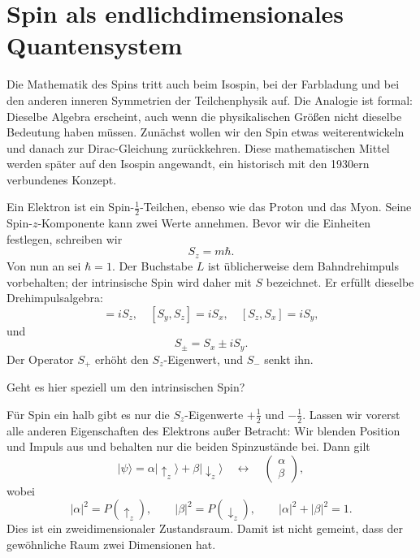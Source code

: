 \section{Spin als endlichdimensionales Quantensystem}

Die Mathematik des Spins tritt auch beim Isospin, bei der Farbladung und bei den anderen inneren Symmetrien der Teilchenphysik auf. Die Analogie ist formal: Dieselbe Algebra erscheint, auch wenn die physikalischen Größen nicht dieselbe Bedeutung haben müssen. Zunächst wollen wir den Spin etwas weiterentwickeln und danach zur Dirac-Gleichung zurückkehren. Diese mathematischen Mittel werden später auf den Isospin angewandt, ein historisch mit den 1930ern verbundenes Konzept.

Ein Elektron ist ein Spin-\(\tfrac12\)-Teilchen, ebenso wie das Proton und das Myon. Seine Spin-\(z\)-Komponente kann zwei Werte annehmen. Bevor wir die Einheiten festlegen, schreiben wir
\begin{equation}
S_z=m\hbar.
\end{equation}
Von nun an sei \(\hbar=1\). Der Buchstabe \(L\) ist üblicherweise dem Bahndrehimpuls vorbehalten; der intrinsische Spin wird daher mit \(S\) bezeichnet. Er erfüllt dieselbe Drehimpulsalgebra:
\begin{equation}
[S_x,S_y]=iS_z,
\quad
[S_y,S_z]=iS_x,
\quad
[S_z,S_x]=iS_y,
\end{equation}
und
\begin{equation}
S_\pm=S_x\pm iS_y.
\end{equation}
Der Operator \(S_+\) erhöht den \(S_z\)-Eigenwert, und \(S_-\) senkt ihn.

\begin{classroomqa}
Geht es hier speziell um den intrinsischen Spin?\audiencequestion{
}
\end{classroomqa}

Für Spin ein halb gibt es nur die \(S_z\)-Eigenwerte \(+\tfrac12\) und \(-\tfrac12\). Lassen wir vorerst alle anderen Eigenschaften des Elektrons außer Betracht: Wir blenden Position und Impuls aus und behalten nur die beiden Spinzustände bei. Dann gilt
\begin{equation}
|\psi\rangle
=
\alpha|\uparrow_z\rangle+\beta|\downarrow_z\rangle
\quad\longleftrightarrow\quad
\begin{pmatrix}
\alpha\\
\beta
\end{pmatrix},
\end{equation}
wobei
\begin{equation}
|\alpha|^2=P(\uparrow_z),
\qquad
|\beta|^2=P(\downarrow_z),
\qquad
|\alpha|^2+|\beta|^2=1.
\end{equation}
Dies ist ein zweidimensionaler Zustandsraum. Damit ist nicht gemeint, dass der gewöhnliche Raum zwei Dimensionen hat.

